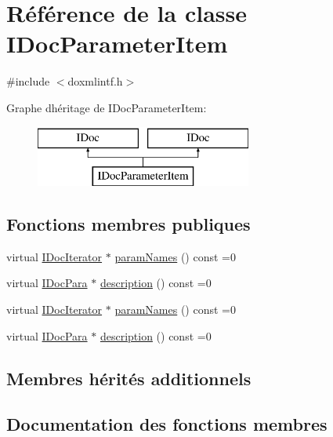 \hypertarget{class_i_doc_parameter_item}{}\section{Référence de la classe I\+Doc\+Parameter\+Item}
\label{class_i_doc_parameter_item}


{\ttfamily \#include $<$doxmlintf.\+h$>$}

Graphe d\textquotesingle{}héritage de I\+Doc\+Parameter\+Item\+:\begin{figure}[H]
\begin{center}
\leavevmode
\includegraphics[height=2.000000cm]{class_i_doc_parameter_item}
\end{center}
\end{figure}
\subsection*{Fonctions membres publiques}
\begin{DoxyCompactItemize}
\item 
virtual \hyperlink{class_i_doc_iterator}{I\+Doc\+Iterator} $\ast$ \hyperlink{class_i_doc_parameter_item_afbd48f640cbc3a5142efa29ad3d72c6f}{param\+Names} () const  =0
\item 
virtual \hyperlink{class_i_doc_para}{I\+Doc\+Para} $\ast$ \hyperlink{class_i_doc_parameter_item_a3c7bd96c386a855ba2b075243da3e4e5}{description} () const  =0
\item 
virtual \hyperlink{class_i_doc_iterator}{I\+Doc\+Iterator} $\ast$ \hyperlink{class_i_doc_parameter_item_afbd48f640cbc3a5142efa29ad3d72c6f}{param\+Names} () const  =0
\item 
virtual \hyperlink{class_i_doc_para}{I\+Doc\+Para} $\ast$ \hyperlink{class_i_doc_parameter_item_a3c7bd96c386a855ba2b075243da3e4e5}{description} () const  =0
\end{DoxyCompactItemize}
\subsection*{Membres hérités additionnels}


\subsection{Documentation des fonctions membres}
\hypertarget{class_i_doc_parameter_item_a3c7bd96c386a855ba2b075243da3e4e5}{}
